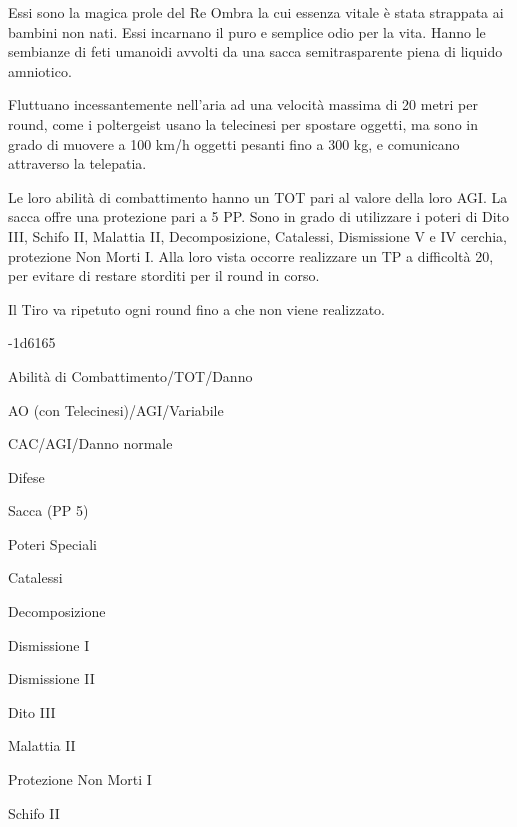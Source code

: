 
Essi sono la magica prole del Re Ombra la cui essenza vitale \`e
stata strappata ai bambini non nati. Essi incarnano il puro e semplice
odio per la vita. Hanno le sembianze di feti umanoidi avvolti da una
sacca semitrasparente piena di liquido amniotico.

Fluttuano incessantemente nell'aria ad una velocit\`a massima di 20
metri per round, come i poltergeist usano la telecinesi per spostare
oggetti, ma sono in grado di muovere a 100 km/h oggetti pesanti fino a
300 kg, e comunicano attraverso la telepatia.

Le loro abilit\`a di combattimento hanno un TOT pari al valore della
loro AGI. La sacca offre una protezione pari a 5 PP. Sono in grado di
utilizzare i poteri di Dito III, Schifo II, Malattia II,
Decomposizione, Catalessi, Dismissione V e IV cerchia, protezione Non
Morti I. Alla loro vista occorre realizzare un TP a difficolt\`a 20,
per evitare di restare storditi per il round in corso. 

Il Tiro va
ripetuto ogni round fino a che non viene realizzato.

{-1d6}{165}

\begin{parmostro}{Abilit\`a di Combattimento/TOT/Danno}
\item AO (con Telecinesi)/AGI/Variabile
\item CAC/AGI/Danno normale
\end{parmostro}

\begin{parmostro}{Difese}
\item Sacca (PP 5)
\end{parmostro}

\begin{parmostro}{Poteri Speciali}
\item Catalessi
\item Decomposizione
\item Dismissione I
\item Dismissione II
\item Dito III
\item Malattia II
\item Protezione Non Morti I
\item Schifo II
\end{parmostro}


